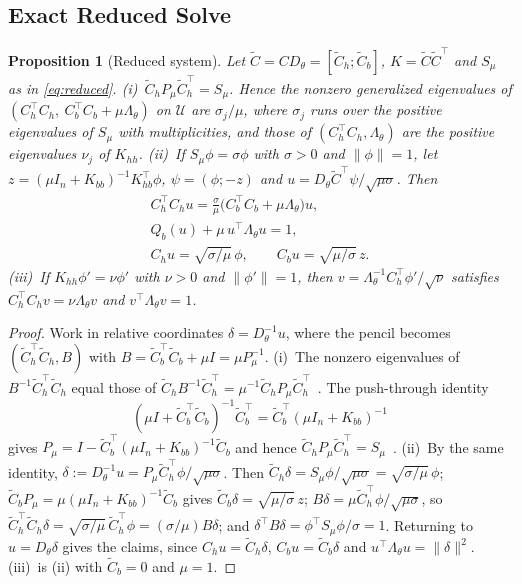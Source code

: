 \documentclass[11pt]{article}
\newtheorem{proposition}{Proposition}
\newcommand{\U}{\mathcal{U}}
\newcommand{\Lam}{\Lambda_{\theta}}
\newcommand{\Ch}{C_{h}}
\newcommand{\Cb}{C_{b}}
\newcommand{\Cth}{\widetilde{C}_{h}}
\newcommand{\Ctb}{\widetilde{C}_{b}}
\newcommand{\Pmu}{P_{\mu}}
\newcommand{\Smu}{S_{\mu}}
\begin{document}
\subsection{Exact Reduced Solve}
\label{app:reduced}

\begin{proposition}[Reduced system]
\label{prop:reduced}
Let $\widetilde C=CD_\theta=[\Cth;\Ctb]$, $K=\widetilde C\widetilde C^\top$ and $\Smu$ as in \cref{eq:reduced}.
(i)~$\Cth\Pmu\Cth^\top=\Smu$. Hence the nonzero generalized eigenvalues of $(\Ch^\top\Ch,\ \Cb^\top\Cb+\mu\Lam)$ on $\U$ are $\sigma_j/\mu$, where $\sigma_j$ runs over the positive eigenvalues of $\Smu$ with multiplicities, and those of $(\Ch^\top\Ch,\Lam)$ are the positive eigenvalues $\nu_j$ of $K_{hh}$.
(ii)~If $\Smu\phi=\sigma\phi$ with $\sigma>0$ and $\|\phi\|=1$, let $z=(\mu I_n+K_{bb})^{-1}K_{hb}^\top\phi$, $\psi=(\phi;-z)$ and $u=D_\theta\widetilde C^\top\psi/\sqrt{\mu\sigma}$. Then
\begin{equation*}
\begin{gathered}
\Ch^\top\Ch u=\tfrac{\sigma}{\mu}\bigl(\Cb^\top\Cb+\mu\Lam\bigr)u,\\
Q_b(u)+\mu\,u^\top\Lam u=1,\\
\Ch u=\sqrt{\sigma/\mu}\,\phi,\qquad \Cb u=\sqrt{\mu/\sigma}\,z .
\end{gathered}
\end{equation*}
(iii)~If $K_{hh}\phi'=\nu\phi'$ with $\nu>0$ and $\|\phi'\|=1$, then $v=\Lam^{-1}\Ch^\top\phi'/\sqrt\nu$ satisfies $\Ch^\top\Ch v=\nu\Lam v$ and $v^\top\Lam v=1$.
\end{proposition}
\begin{proof}
Work in relative coordinates $\delta=D_\theta^{-1}u$, where the pencil becomes $(\Cth^\top\Cth,B)$ with $B=\Ctb^\top\Ctb+\mu I=\mu\Pmu^{-1}$. (i)~The nonzero eigenvalues of $B^{-1}\Cth^\top\Cth$ equal those of $\Cth B^{-1}\Cth^\top=\mu^{-1}\Cth\Pmu\Cth^\top$~\citep{horn2012matrix}. The push-through identity
\begin{equation*}
(\mu I+\Ctb^\top\Ctb)^{-1}\Ctb^\top=\Ctb^\top(\mu I_n+K_{bb})^{-1}
\end{equation*}
gives $\Pmu=I-\Ctb^\top(\mu I_n+K_{bb})^{-1}\Ctb$ and hence $\Cth\Pmu\Cth^\top=\Smu$~\citep{golub2013matrix}. (ii)~By the same identity, $\delta:=D_\theta^{-1}u=\Pmu\Cth^\top\phi/\sqrt{\mu\sigma}$. Then $\Cth\delta=\Smu\phi/\sqrt{\mu\sigma}=\sqrt{\sigma/\mu}\,\phi$; $\Ctb\Pmu=\mu(\mu I_n+K_{bb})^{-1}\Ctb$ gives $\Ctb\delta=\sqrt{\mu/\sigma}\,z$; $B\delta=\mu\Cth^\top\phi/\sqrt{\mu\sigma}$, so $\Cth^\top\Cth\delta=\sqrt{\sigma/\mu}\,\Cth^\top\phi=(\sigma/\mu)B\delta$; and $\delta^\top B\delta=\phi^\top\Smu\phi/\sigma=1$. Returning to $u=D_\theta\delta$ gives the claims, since $\Ch u=\Cth\delta$, $\Cb u=\Ctb\delta$ and $u^\top\Lam u=\|\delta\|^2$. (iii)~is (ii) with $\Ctb=0$ and $\mu=1$.
\end{proof}
\end{document}
